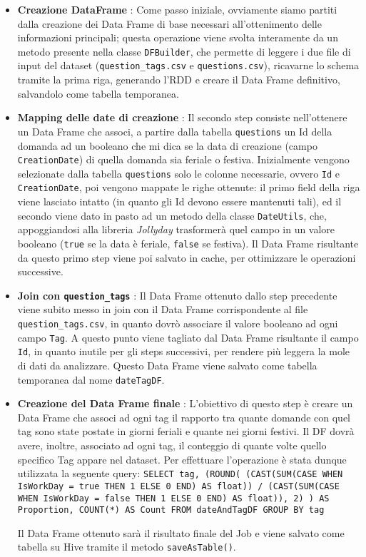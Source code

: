   \begin{itemize}
    \item \textbf{Creazione DataFrame} \label{par:job1:spark:implementation:firststep} : Come passo iniziale, ovviamente siamo partiti
    dalla creazione dei Data Frame di base
    necessari all'ottenimento delle informazioni principali; questa operazione viene svolta interamente da un metodo presente nella
    classe \texttt{DFBuilder}, che permette di leggere i due file di input del dataset (\texttt{question\_tags.csv} e
    \texttt{questions.csv}), ricavarne lo schema tramite la prima riga, generando l'RDD e creare il Data Frame definitivo,
    salvandolo come tabella temporanea.
    \item \textbf{Mapping delle date di creazione} : Il secondo step consiste nell'ottenere un Data Frame che associ, a partire dalla
    tabella \texttt{questions} un Id della domanda ad un booleano che mi dica se la data di creazione (campo \texttt{CreationDate})
    di quella domanda sia feriale o festiva.
    Inizialmente vengono selezionate dalla tabella \texttt{questions} solo le colonne necessarie, ovvero \texttt{Id} e
    \texttt{CreationDate}, poi vengono mappate le righe ottenute: il primo field della riga viene lasciato intatto (in quanto gli
    Id devono essere mantenuti tali), ed il secondo viene dato in pasto ad un metodo della classe \texttt{DateUtils}, che,
    appoggiandosi alla libreria \textit{Jollyday} trasformerà quel campo in un valore booleano (\texttt{true} se la data è
    feriale, \texttt{false} se festiva).
    Il Data Frame risultante da questo primo step viene poi salvato in cache, per ottimizzare le operazioni successive.
    \item \textbf{Join con \texttt{question\_tags}} : Il Data Frame ottenuto dallo step precedente viene subito messo in join
    con il Data Frame corrispondente al file \texttt{question\_tags.csv}, in quanto dovrò associare il valore booleano ad ogni
    campo \texttt{Tag}.
    A questo punto viene tagliato dal Data Frame risultante il campo \texttt{Id}, in quanto inutile per gli steps successivi, per
    rendere più leggera la mole di dati da analizzare.
    Questo Data Frame viene salvato come tabella temporanea dal nome \texttt{dateTagDF}.
    \item \textbf{Creazione del Data Frame finale} : L'obiettivo di questo step è creare un Data Frame che associ ad ogni tag
    il rapporto tra quante domande con quel tag sono state postate in giorni feriali e quante nei giorni festivi.
    Il DF dovrà avere, inoltre, associato ad ogni tag, il conteggio di quante volte quello specifico Tag appare nel dataset.
    Per effettuare l'operazione è stata dunque utilizzata la seguente query:
    \texttt{SELECT tag, (ROUND(
    (CAST(SUM(CASE WHEN IsWorkDay = true THEN 1 ELSE 0 END) AS float)) /
    (CAST(SUM(CASE WHEN IsWorkDay = false THEN 1 ELSE 0 END) AS float)), 2)
    ) AS Proportion,
    COUNT(*) AS Count
    FROM dateAndTagDF GROUP BY tag}

    Il Data Frame ottenuto sarà il risultato finale del Job e viene salvato come tabella su Hive tramite il metodo
    \texttt{saveAsTable()}.
  \end{itemize}

